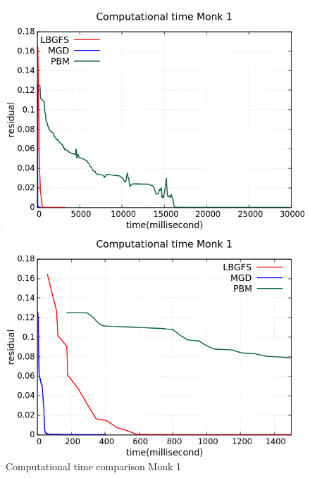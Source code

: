 \begin{figure}[H]
	\centering
	\begin{minipage}[t]{0.5\linewidth}
		\includegraphics[width=\linewidth]{data/Comparison/Monk1/Monk1_CT_Comparison_standard.png}
	\end{minipage}%
	\begin{minipage}[t]{0.5\linewidth}
		\includegraphics[width=\linewidth]{data/Comparison/Monk1/Monk1_CT_Comparison_zoom.png}
	\end{minipage}
	\caption{Computational time comparison Monk 1}
	\label{CT-Monk1}
\end{figure}
